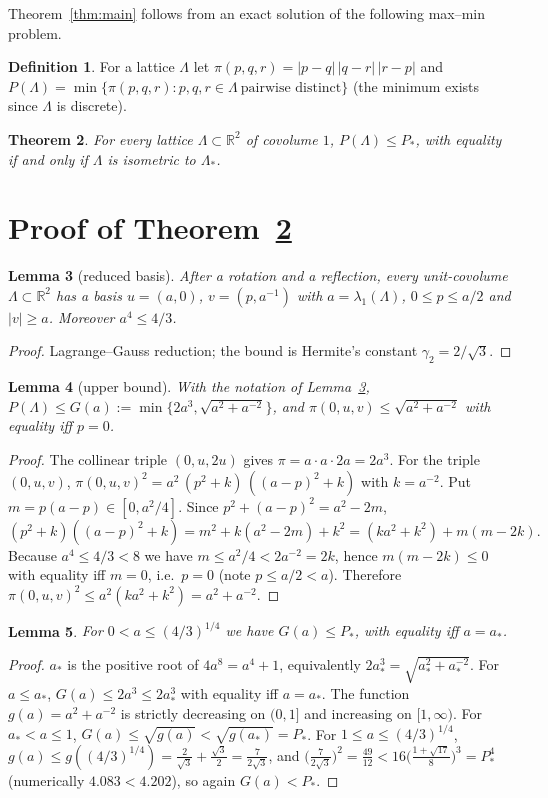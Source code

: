 \documentclass[11pt,a4paper]{amsart}
\newtheorem{theorem}{Theorem}
\newtheorem{lemma}[theorem]{Lemma}
\theoremstyle{definition}
\newtheorem{definition}[theorem]{Definition}
\newcommand{\R}{\mathbb{R}}
\newcommand{\Lat}{\Lambda}
\begin{document}
Theorem~\ref{thm:main} follows from an exact solution of the following max--min problem.
\begin{definition}
For a lattice $\Lat$ let $\pi(p,q,r)=|p-q|\,|q-r|\,|r-p|$ and
$P(\Lat)=\min\{\pi(p,q,r):p,q,r\in\Lat\ \text{pairwise distinct}\}$ (the minimum exists since $\Lat$ is discrete).
\end{definition}
\begin{theorem}\label{thm:maxmin}
For every lattice $\Lat\subset\R^2$ of covolume $1$, $P(\Lat)\le P_*$, with equality if and only if $\Lat$ is isometric to $\Lat_*$.
\end{theorem}

\section{Proof of Theorem~\ref{thm:maxmin}}
\begin{lemma}[reduced basis]\label{lem:red}
After a rotation and a reflection, every unit-covolume $\Lat\subset\R^2$ has a basis $u=(a,0)$, $v=(p,a^{-1})$ with $a=\lambda_1(\Lat)$, $0\le p\le a/2$ and $|v|\ge a$. Moreover $a^4\le 4/3$.
\end{lemma}
\begin{proof}
Lagrange--Gauss reduction; the bound is Hermite's constant $\gamma_2=2/\sqrt3$.
\end{proof}

\begin{lemma}[upper bound]\label{lem:upper}
With the notation of Lemma~\ref{lem:red},
$P(\Lat)\le G(a):=\min\{2a^3,\sqrt{a^2+a^{-2}}\}$, and $\pi(0,u,v)\le\sqrt{a^2+a^{-2}}$ with equality iff $p=0$.
\end{lemma}
\begin{proof}
The collinear triple $(0,u,2u)$ gives $\pi=a\cdot a\cdot2a=2a^3$. For the triple $(0,u,v)$,
$\pi(0,u,v)^2=a^2\,(p^2+k)\,((a-p)^2+k)$ with $k=a^{-2}$. Put $m=p(a-p)\in[0,a^2/4]$. Since $p^2+(a-p)^2=a^2-2m$,
\[
(p^2+k)((a-p)^2+k)=m^2+k(a^2-2m)+k^2=(ka^2+k^2)+m(m-2k).
\]
Because $a^4\le4/3<8$ we have $m\le a^2/4<2a^{-2}=2k$, hence $m(m-2k)\le0$ with equality iff $m=0$, i.e.\ $p=0$ (note $p\le a/2<a$). Therefore $\pi(0,u,v)^2\le a^2(ka^2+k^2)=a^2+a^{-2}$.
\end{proof}

\begin{lemma}\label{lem:G}
For $0<a\le(4/3)^{1/4}$ we have $G(a)\le P_*$, with equality iff $a=a_*$.
\end{lemma}
\begin{proof}
$a_*$ is the positive root of $4a^8=a^4+1$, equivalently $2a_*^3=\sqrt{a_*^2+a_*^{-2}}$. For $a\le a_*$, $G(a)\le2a^3\le2a_*^3$ with equality iff $a=a_*$. The function $g(a)=a^2+a^{-2}$ is strictly decreasing on $(0,1]$ and increasing on $[1,\infty)$. For $a_*<a\le1$, $G(a)\le\sqrt{g(a)}<\sqrt{g(a_*)}=P_*$. For $1\le a\le(4/3)^{1/4}$, $g(a)\le g((4/3)^{1/4})=\tfrac{2}{\sqrt3}+\tfrac{\sqrt3}{2}=\tfrac{7}{2\sqrt3}$, and $\bigl(\tfrac{7}{2\sqrt3}\bigr)^2=\tfrac{49}{12}<16\bigl(\tfrac{1+\sqrt{17}}{8}\bigr)^3=P_*^4$ (numerically $4.083<4.202$), so again $G(a)<P_*$.
\end{proof}
\end{document}
